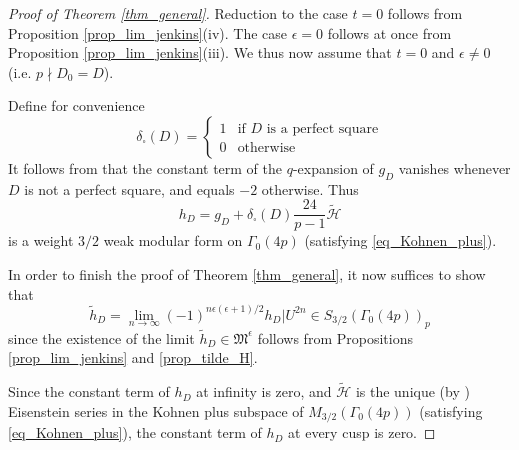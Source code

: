 \documentclass[11pt,letterpaper]{amsart}
\newcommand{\cH}{{\mathcal H}}
\newcommand{\gM}{{\mathfrak M}}
\theoremstyle{remark}
\begin{document}
\begin{proof}[Proof of Theorem \ref{thm_general}]
Reduction to the case $t=0$ follows from Proposition \ref{prop_lim_jenkins}(iv). 
The case $\epsilon=0$ follows at once from Proposition \ref{prop_lim_jenkins}(iii).
We thus now assume that $t=0$ and $\epsilon \neq 0$ (i.e. $p \nmid D_0=D$). 

Define for convenience 
\[
\delta_\square(D) = \begin{cases} 1 & \text{if $D$ is a perfect square} \\ 0 & \text{otherwise} \end{cases}
\]
It follows from \cite[Theorem 4]{Zagier_traces} that the constant term of the $q$-expansion  of $g_D$ vanishes whenever $D$ is not a perfect square, and equals $-2$ otherwise.
Thus
\[
h_D = g_D + \delta_\square(D)\frac{24}{p-1} \tilde{\cH}
\]
is a weight $3/2$ weak modular form on $\Gamma_0(4p)$ (satisfying \eqref{eq_Kohnen_plus}).

In order to finish the proof of Theorem \ref{thm_general}, it now suffices to show that 
\begin{equation} \label{eq_limit_2}
\tilde{h}_D=\lim_{n \rightarrow \infty} (-1)^{n \epsilon (\epsilon+1)/2} h_D|U^{2n} \in S_{3/2}(\Gamma_0(4p))_p
\end{equation}
since the existence of the limit  $\tilde{h}_D \in \gM^\epsilon$ follows from Propositions \ref{prop_lim_jenkins} and \ref{prop_tilde_H}.

Since the constant term of $h_D$ at infinity is zero, and $\tilde{\cH}$ is the unique (by \cite[Theorem 1(I)]{Wang_Pei}) Eisenstein series in the Kohnen plus subspace of $M_{3/2}(\Gamma_0(4p))$ (satisfying \eqref{eq_Kohnen_plus}),
the constant term of $h_D$ at every cusp is zero. 


\end{proof}
\end{document}
